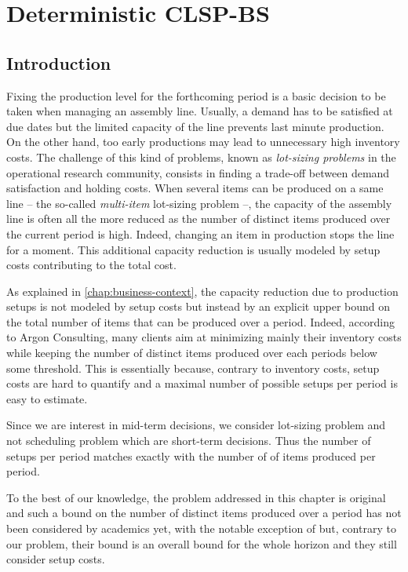 \chapter{Deterministic CLSP-BS}
\label{chap:PDP:deterministic}


\section{Introduction}
\label{sec:PDP:deterministic:Motivations}

Fixing the production level for the forthcoming period is a basic decision to be taken when managing an assembly line. Usually, a demand has to be satisfied at due dates but the limited capacity of the line prevents last minute production. On the other hand, too early productions may lead to unnecessary high inventory costs. The challenge of this kind of problems, known as {\em lot-sizing problems} in the operational research community, consists in finding a trade-off between demand satisfaction and holding costs.
When several items can be produced on a same line -- the so-called {\em multi-item} lot-sizing problem --, the capacity of the assembly line is often all the more reduced as the number of distinct items produced over the current period is high. Indeed, changing an item in production stops the line for a moment. This additional capacity reduction is usually modeled by setup costs contributing to the total cost.


As explained in \cref{chap:business-context}, the capacity reduction due to production setups is not modeled by setup costs but instead by an explicit upper bound on the total number of items that can be produced over a period.
Indeed, according to Argon Consulting, many clients aim at minimizing mainly their inventory costs while keeping the number of distinct items produced over each periods below some threshold. This is essentially because, contrary to inventory costs, setup costs are hard to quantify and a maximal number of possible setups per period is easy to estimate.

Since we are interest in mid-term decisions, we consider lot-sizing problem and not scheduling problem which are short-term decisions. Thus the number of setups per period matches exactly with the number of of items produced per period.


To the best of our knowledge, the problem addressed in this chapter is original and such a bound on the number of distinct items produced over a period has not been considered by academics yet, with the notable exception of \cite{Rubaszewski2011} but, contrary to our problem, their bound is an overall bound for the whole horizon and they still consider setup costs.


